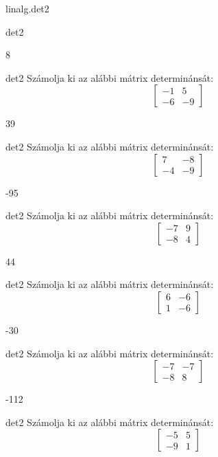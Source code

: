 \documentclass[12pt]{article}
\begin{document}
\begin{quiz}{linalg.det2}
\begin{numerical}{det2}
\item 8
\end{numerical}


\begin{numerical}{det2}
Számolja ki az alábbi mátrix determinánsát:
$$\left[\begin{array}{cc}-1& 5\\ -6& -9\end{array}\right]$$

\item 39
\end{numerical}


\begin{numerical}{det2}
Számolja ki az alábbi mátrix determinánsát:
$$\left[\begin{array}{cc}7& -8\\ -4& -9\end{array}\right]$$

\item -95
\end{numerical}


\begin{numerical}{det2}
Számolja ki az alábbi mátrix determinánsát:
$$\left[\begin{array}{cc}-7& 9\\ -8& 4\end{array}\right]$$

\item 44
\end{numerical}


\begin{numerical}{det2}
Számolja ki az alábbi mátrix determinánsát:
$$\left[\begin{array}{cc}6& -6\\ 1& -6\end{array}\right]$$

\item -30
\end{numerical}


\begin{numerical}{det2}
Számolja ki az alábbi mátrix determinánsát:
$$\left[\begin{array}{cc}-7& -7\\ -8& 8\end{array}\right]$$

\item -112
\end{numerical}


\begin{numerical}{det2}
Számolja ki az alábbi mátrix determinánsát:
$$\left[\begin{array}{cc}-5& 5\\ -9& 1\end{array}\right]$$


\end{numerical}
\end{quiz}
\end{document}
